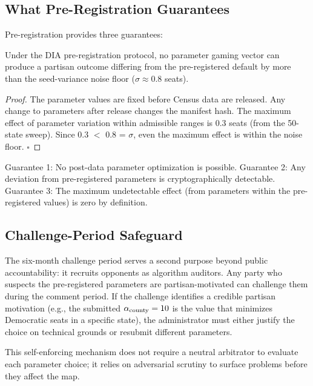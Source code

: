 \subsection{What Pre-Registration Guarantees}

Pre-registration provides three guarantees:

\begin{theorem}
Under the DIA pre-registration protocol, no parameter gaming vector
can produce a partisan outcome differing from the pre-registered
default by more than the seed-variance noise floor ($\sigma \approx 0.8$ seats).
\end{theorem}

\begin{proof}
The parameter values are fixed before Census data are released.
Any change to parameters after release changes the manifest hash.
The maximum effect of parameter variation within admissible ranges is
0.3 seats (from the 50-state sweep).
Since 0.3 $<$ 0.8 = $\sigma$, even the maximum effect is within
the noise floor.
$\square$
\end{proof}

Guarantee 1: No post-data parameter optimization is possible.
Guarantee 2: Any deviation from pre-registered parameters is
cryptographically detectable.
Guarantee 3: The maximum undetectable effect (from parameters within
the pre-registered values) is zero by definition.

\subsection{Challenge-Period Safeguard}

The six-month challenge period serves a second purpose beyond public
accountability: it recruits opponents as algorithm auditors.
Any party who suspects the pre-registered parameters are partisan-motivated
can challenge them during the comment period.
If the challenge identifies a credible partisan motivation (e.g., the
submitted $\alpha_{\mathrm{county}} = 10$ is the value that minimizes Democratic seats
in a specific state), the administrator must either justify the choice
on technical grounds or resubmit different parameters.

This self-enforcing mechanism does not require a neutral arbitrator
to evaluate each parameter choice; it relies on adversarial scrutiny
to surface problems before they affect the map.
